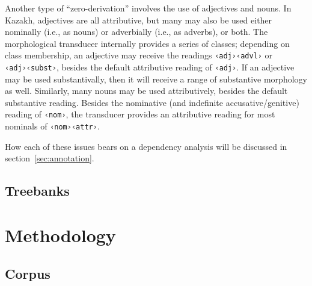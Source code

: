 \documentclass[a4paper,11pt, onecolumn,twoside]{article}
\newcommand{\tag}[1]{\texttt{‹#1›}}
\begin{document}
Another type of ``zero-derivation'' involves the use of adjectives and nouns.  In Kazakh, adjectives are all attributive, but many may also be used either nominally (i.e., as nouns) or adverbially (i.e., as adverbs), or both.  The morphological transducer internally provides a series of classes; depending on class membership, an adjective may receive the readings \tag{adj}\tag{advl} or \tag{adj}\tag{subst}, besides the default attributive reading of \tag{adj}.  If an adjective may be used substantivally, then it will receive a range of substantive morphology as well.  Similarly, many nouns may be used attributively, besides the default substantive reading.  Besides the nominative (and indefinite accusative/genitive) reading of \tag{nom}, the transducer provides an attributive reading for most nominals of \tag{nom}\tag{attr}.

How each of these issues bears on a dependency analysis will be discussed in section~\ref{sec:annotation}.


\subsection{Treebanks} %


\section{Methodology}

\subsection{Corpus}
\end{document}
